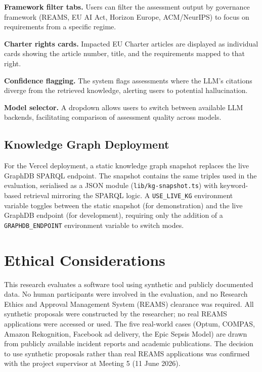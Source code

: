 \textbf{Framework filter tabs.} Users can filter the assessment output by governance framework (REAMS, EU AI Act, Horizon Europe, ACM/NeurIPS) to focus on requirements from a specific regime.

\textbf{Charter rights cards.} Impacted EU Charter articles are displayed as individual cards showing the article number, title, and the requirements mapped to that right.

\textbf{Confidence flagging.} The system flags assessments where the LLM's citations diverge from the retrieved knowledge, alerting users to potential hallucination.

\textbf{Model selector.} A dropdown allows users to switch between available LLM backends, facilitating comparison of assessment quality across models.


\subsection{Knowledge Graph Deployment}

For the Vercel deployment, a static knowledge graph snapshot replaces the live GraphDB SPARQL endpoint. The snapshot contains the same triples used in the evaluation, serialised as a JSON module (\texttt{lib/kg-snapshot.ts}) with keyword-based retrieval mirroring the SPARQL logic. A \texttt{USE\_LIVE\_KG} environment variable toggles between the static snapshot (for demonstration) and the live GraphDB endpoint (for development), requiring only the addition of a \texttt{GRAPHDB\_ENDPOINT} environment variable to switch modes.


\section{Ethical Considerations}

This research evaluates a software tool using synthetic and publicly documented data. No human participants were involved in the evaluation, and no Research Ethics and Approval Management System (REAMS) clearance was required. All synthetic proposals were constructed by the researcher; no real REAMS applications were accessed or used. The five real-world cases (Optum, COMPAS, Amazon Rekognition, Facebook ad delivery, the Epic Sepsis Model) are drawn from publicly available incident reports and academic publications. The decision to use synthetic proposals rather than real REAMS applications was confirmed with the project supervisor at Meeting 5 (11 June 2026).


